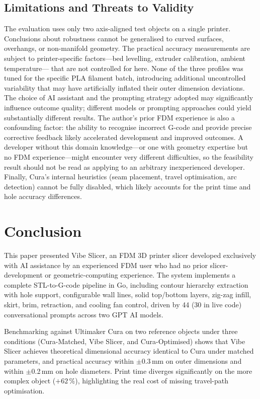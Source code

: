 \documentclass[10pt,twocolumn,a4paper]{article}
\begin{document}
\subsection{Limitations and Threats to Validity}

The evaluation uses only two axis-aligned test objects on a single
printer. Conclusions about robustness cannot be generalised to
curved surfaces, overhangs, or non-manifold geometry.
The practical accuracy measurements are subject to printer-specific
factors—bed levelling, extruder calibration, ambient temperature—
that are not controlled for here.
None of the three profiles was tuned for the specific PLA
filament batch, introducing additional uncontrolled variability
that may have artificially inflated their outer dimension deviations.
The choice of AI assistant and the prompting strategy adopted may
significantly influence outcome quality; different models or
prompting approaches could yield substantially different results.
The author's prior FDM experience is also a confounding factor:
the ability to recognise incorrect G-code and provide precise
corrective feedback likely accelerated development and improved
outcomes. A developer without this domain knowledge—or one with
geometry expertise but no FDM experience—might encounter very
different difficulties, so the feasibility result should not be
read as applying to an arbitrary inexperienced developer.
Finally, Cura's internal heuristics (seam placement, travel
optimisation, arc detection) cannot be fully disabled,
which likely accounts for the print time and hole accuracy differences.

\section{Conclusion}
\label{sec:conclusion}

This paper presented Vibe Slicer, an FDM 3D printer slicer
developed exclusively with AI assistance by an experienced FDM
user who had no prior slicer-development or geometric-computing
experience.
The system implements a complete STL-to-G-code pipeline in Go,
including contour hierarchy extraction with hole support,
configurable wall lines, solid top/bottom layers, zig-zag infill,
skirt, brim, retraction, and cooling fan control,
driven by 44 (30 in live code) conversational prompts across two GPT AI models.

Benchmarking against Ultimaker Cura on two reference objects under
three conditions (Cura-Matched, Vibe Slicer, and Cura-Optimised)
shows that Vibe Slicer achieves theoretical dimensional accuracy
identical to Cura under matched parameters, and practical accuracy
within $\pm$0.3\,mm on outer dimensions and within $\pm$0.2\,mm
on hole diameters.
Print time diverges significantly on the more complex object
($+62$\,\%), highlighting the real cost of missing travel-path
optimisation.
\end{document}
